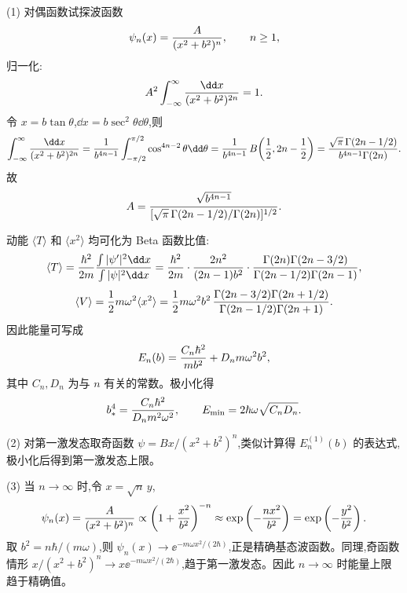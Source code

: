 \begin{solution}
(1) 对偶函数试探波函数
\[
\psi_n(x)={A\over(x^2+b^2)^n},\qquad n\ge1,
\]
归一化:
\[
A^2\int_{-\infty}^\infty{\dd x\over(x^2+b^2)^{2n}}=1.
\]
令 $x=b\tan\theta$,$\dd x=b\sec^2\theta\dd\theta$,则
\[
\int_{-\infty}^\infty{\dd x\over(x^2+b^2)^{2n}}
={1\over b^{4n-1}}\int_{-\pi/2}^{\pi/2}\cos^{4n-2}\theta\dd\theta
={1\over b^{4n-1}}\,B\!\left({1\over2},2n-{1\over2}\right)
={\sqrt\pi\,\Gamma(2n-1/2)\over b^{4n-1}\Gamma(2n)}.
\]
故
\[
A={\sqrt{b^{4n-1}}\over[\sqrt\pi\,\Gamma(2n-1/2)/\Gamma(2n)]^{1/2}}.
\]

动能 $\langle T\rangle$ 和 $\langle x^2\rangle$ 均可化为 Beta 函数比值:
\[
\langle T\rangle={\hbar^2\over2m}{\int|\psi'|^2\dd x\over\int|\psi|^2\dd x}
={\hbar^2\over2m}\cdot{2n^2\over(2n-1)b^2}\cdot{\Gamma(2n)\Gamma(2n-3/2)\over\Gamma(2n-1/2)\Gamma(2n-1)},
\]
\[
\langle V\rangle={1\over2}m\omega^2\langle x^2\rangle
={1\over2}m\omega^2b^2\,{\Gamma(2n-3/2)\Gamma(2n+1/2)\over\Gamma(2n-1/2)\Gamma(2n+1)}.
\]
因此能量可写成
\[
E_n(b)={C_n\hbar^2\over mb^2}+D_n m\omega^2 b^2,
\]
其中 $C_n,D_n$ 为与 $n$ 有关的常数。极小化得
\[
b_*^4={C_n\hbar^2\over D_n m^2\omega^2},\qquad
E_{\min}=2\hbar\omega\sqrt{C_nD_n}.
\]

(2) 对第一激发态取奇函数 $\psi=Bx/(x^2+b^2)^n$,类似计算得 $E_n^{(1)}(b)$ 的表达式,极小化后得到第一激发态上限。

(3) 当 $n\to\infty$ 时,令 $x=\sqrt{n}\,y$,
\[
\psi_n(x)={A\over(x^2+b^2)^n}
\propto\left(1+{x^2\over b^2}\right)^{-n}
\approx\exp\left(-{n x^2\over b^2}\right)
=\exp\left(-{y^2\over b^2}\right).
\]
取 $b^2=n\hbar/(m\omega)$,则 $\psi_n(x)\to \ee^{-m\omega x^2/(2\hbar)}$,正是精确基态波函数。同理,奇函数情形 $x/(x^2+b^2)^n\to x \ee^{-m\omega x^2/(2\hbar)}$,趋于第一激发态。因此 $n\to\infty$ 时能量上限趋于精确值。
\end{solution}


